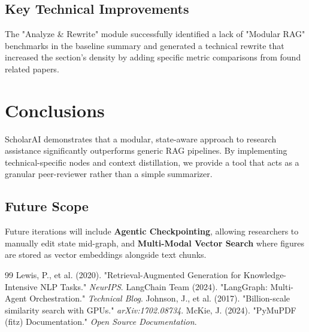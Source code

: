 \documentclass[11pt,a4paper,oneside]{report}
\begin{document}
\section{Key Technical Improvements}
The "Analyze & Rewrite" module successfully identified a lack of "Modular RAG" benchmarks in the baseline summary and generated a technical rewrite that increased the section's density by adding specific metric comparisons from found related papers.

\chapter{Conclusions}
\label{ch:conclusions}

ScholarAI demonstrates that a modular, state-aware approach to research assistance significantly outperforms generic RAG pipelines. By implementing technical-specific nodes and context distillation, we provide a tool that acts as a granular peer-reviewer rather than a simple summarizer.

\section{Future Scope}
Future iterations will include \textbf{Agentic Checkpointing}, allowing researchers to manually edit state mid-graph, and \textbf{Multi-Modal Vector Search} where figures are stored as vector embeddings alongside text chunks.


\begin{thebibliography}{99}
 Lewis, P., et al. (2020). "Retrieval-Augmented Generation for Knowledge-Intensive NLP Tasks." \textit{NeurIPS}.
 LangChain Team (2024). "LangGraph: Multi-Agent Orchestration." \textit{Technical Blog}.
 Johnson, J., et al. (2017). "Billion-scale similarity search with GPUs." \textit{arXiv:1702.08734}.
 McKie, J. (2024). "PyMuPDF (fitz) Documentation." \textit{Open Source Documentation}.
\end{thebibliography}
\end{document}
